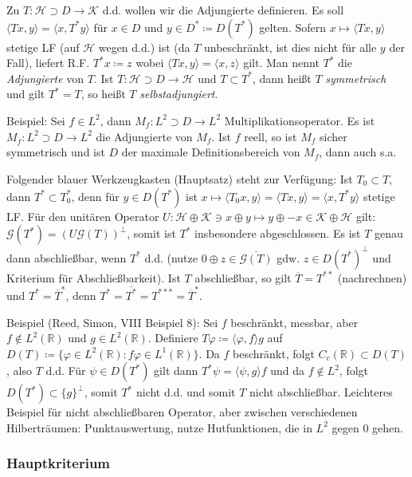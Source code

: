 \documentclass[11pt,a4paper]{scrartcl}
\newcommand{\R}{\mathbb{R}} %
\newcommand{\Hc}{\mathcal{H}}
\newcommand{\Kc}{\mathcal{K}}
\newcommand{\G}{\mathcal{G}}
\theoremstyle{plain}
\theoremstyle{definition}
\theoremstyle{remark}
\begin{document}
Zu $T:\Hc \supset D \to \Kc$ d.d. wollen wir die Adjungierte definieren. Es soll $\langle Tx,y \rangle = \langle x, T^*y \rangle$ für $x\in D$ und $y\in D^*\coloneqq D(T^*)$ gelten. Sofern $x\mapsto \langle Tx, y \rangle$ stetige LF (auf $\Hc$ wegen d.d.) ist (da $T$ unbeschränkt, ist dies nicht für alle $y$ der Fall), liefert R.F. $T^*x\coloneqq z$ wobei $\langle Tx,y \rangle = \langle x, z \rangle$ gilt. Man nennt $T^*$ die \emph{Adjungierte} von $T$. Ist $T: \Hc \supset D \to \Hc$ und $T \subset T^*$, dann heißt $T$ \emph{symmetrisch} und gilt $T^*=T$, so heißt $T$ \emph{selbstadjungiert}. 

Beispiel: Sei $f\in L^2$, dann $M_f: L^2\supset D \to L^2$ Multiplikationsoperator. Es ist $M_{\overline{f}}: L^2 \supset D \to L^2$ die Adjungierte von $M_f$. Ist $f$ reell, so ist $M_f$ sicher symmetrisch und ist $D$ der maximale Definitionsbereich von $M_f$, dann auch s.a.

Folgender blauer Werkzeugkasten (Hauptsatz) steht zur Verfügung: Ist $T_0 \subset T$, dann $T^* \subset T_0^*$, denn für $y\in D(T^*)$ ist $x\mapsto \langle T_0 x, y \rangle = \langle Tx, y\rangle = \langle x, T^* y \rangle$ stetige LF. Für den unitären Operator $U: \Hc \oplus \Kc \ni x \oplus y \mapsto y \oplus -x \in \Kc \oplus \Hc$ gilt: $\G(T^*) = (U\G(T))^\perp$, somit ist $T^*$ insbesondere abgeschlossen. Es ist $T$ genau dann abschließbar, wenn $T^*$ d.d. (nutze $0\oplus z \in \overline{\G(T)}$ gdw. $z\in D(T^*)^\perp$ und Kriterium für Abschließbarkeit). Ist $T$ abschließbar, so gilt $\overline{T} = T^{**}$ (nachrechnen) und $T^* = \overline{T}^*$, denn $T^*=\overline{T^*}=T^{***}=\overline{T}^*$.

Beispiel (Reed, Simon, VIII Beispiel 8): Sei $f$ beschränkt, messbar, aber $f\not\in L^2(\R)$ und $g\in L^2(\R)$. Definiere $T\varphi \coloneqq \langle \varphi, f \rangle g$ auf $D(T)\coloneqq \{ \varphi\in L^2(\R): f\varphi \in L^1(\R) \}$. Da $f$ beschränkt, folgt $C_c(\R) \subset D(T)$, also $T$ d.d. Für $\psi \in D(T^*)$ gilt dann $T^*\psi = \langle \psi, g \rangle f$ und da $f\not \in L^2$, folgt $D(T^*) \subset \{ g \}^\perp$, somit $T^*$ nicht d.d. und somit $T$ nicht abschließbar. Leichteres Beispiel für nicht abschließbaren Operator, aber zwischen verschiedenen Hilberträumen: Punktauswertung, nutze Hutfunktionen, die in $L^2$ gegen $0$ gehen.

\subsubsection{Hauptkriterium}
\end{document}
